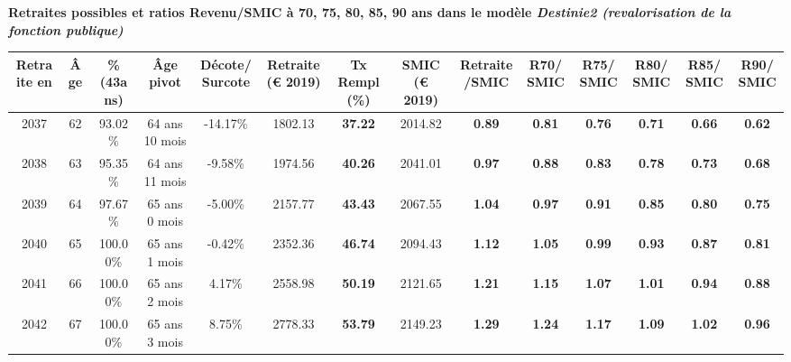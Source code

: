  \vspace{0.1cm} 
{\bf \noindent Retraites possibles et ratios Revenu/SMIC à 70, 75, 80, 85, 90 ans dans le modèle \emph{Destinie2 (revalorisation de la fonction publique)}}  
 
\begin{adjustbox}{max width=\textwidth} 
\begin{tabular}[htb]{|c|c||c|c|c||c|c||c|c||c|c|c|c|c|} 
\hline 
 Retraite en &  Âge &  \%(43ans) &  Âge pivot &  Décote/Surcote &  Retraite (\euro{} 2019) &  Tx Rempl(\%) &  SMIC (\euro{} 2019) &  Retraite/SMIC &  R70/SMIC &  R75/SMIC &  R80/SMIC &  R85/SMIC &  R90/SMIC \\ 
\hline \hline 
 2037 &  62 &  93.02\% &  64 ans 10 mois &  -14.17\% &  1802.13 &  {\bf 37.22} &  2014.82 &  {\bf {\color{red} 0.89}} &  {\bf {\color{red} 0.81}} &  {\bf {\color{red} 0.76}} &  {\bf {\color{red} 0.71}} &  {\bf {\color{red} 0.66}} &  {\bf {\color{red} 0.62}} \\ 
\hline 
 2038 &  63 &  95.35\% &  64 ans 11 mois &  -9.58\% &  1974.56 &  {\bf 40.26} &  2041.01 &  {\bf {\color{red} 0.97}} &  {\bf {\color{red} 0.88}} &  {\bf {\color{red} 0.83}} &  {\bf {\color{red} 0.78}} &  {\bf {\color{red} 0.73}} &  {\bf {\color{red} 0.68}} \\ 
\hline 
 2039 &  64 &  97.67\% &  65 ans 0 mois &  -5.00\% &  2157.77 &  {\bf 43.43} &  2067.55 &  {\bf 1.04} &  {\bf {\color{red} 0.97}} &  {\bf {\color{red} 0.91}} &  {\bf {\color{red} 0.85}} &  {\bf {\color{red} 0.80}} &  {\bf {\color{red} 0.75}} \\ 
\hline 
 2040 &  65 &  100.00\% &  65 ans 1 mois &  -0.42\% &  2352.36 &  {\bf 46.74} &  2094.43 &  {\bf 1.12} &  {\bf 1.05} &  {\bf {\color{red} 0.99}} &  {\bf {\color{red} 0.93}} &  {\bf {\color{red} 0.87}} &  {\bf {\color{red} 0.81}} \\ 
\hline 
 2041 &  66 &  100.00\% &  65 ans 2 mois &  4.17\% &  2558.98 &  {\bf 50.19} &  2121.65 &  {\bf 1.21} &  {\bf 1.15} &  {\bf 1.07} &  {\bf 1.01} &  {\bf {\color{red} 0.94}} &  {\bf {\color{red} 0.88}} \\ 
\hline 
 2042 &  67 &  100.00\% &  65 ans 3 mois &  8.75\% &  2778.33 &  {\bf 53.79} &  2149.23 &  {\bf 1.29} &  {\bf 1.24} &  {\bf 1.17} &  {\bf 1.09} &  {\bf 1.02} &  {\bf {\color{red} 0.96}} \\ 
\hline 
\hline 
\end{tabular} 
\end{adjustbox} 
 
 \vspace{0.1cm} 

